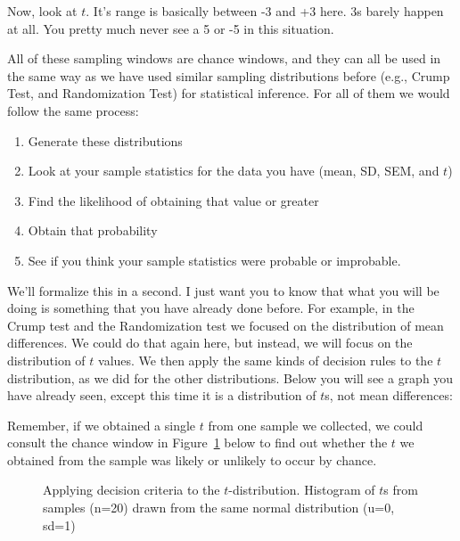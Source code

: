 \documentclass[
  letterpaper,
  DIV=11,
  numbers=noendperiod]{scrreprt}
\providecommand{\tightlist}{%
  \setlength{\itemsep}{0pt}\setlength{\parskip}{0pt}}\usepackage{longtable,booktabs,array}
\begin{document}
Now, look at \(t\). It's range is basically between -3 and +3 here. 3s
barely happen at all. You pretty much never see a 5 or -5 in this
situation.

All of these sampling windows are chance windows, and they can all be
used in the same way as we have used similar sampling distributions
before (e.g., Crump Test, and Randomization Test) for statistical
inference. For all of them we would follow the same process:

\begin{enumerate}
\def\labelenumi{\arabic{enumi}.}
\tightlist
\item
  Generate these distributions
\item
  Look at your sample statistics for the data you have (mean, SD, SEM,
  and \(t\))
\item
  Find the likelihood of obtaining that value or greater
\item
  Obtain that probability
\item
  See if you think your sample statistics were probable or improbable.
\end{enumerate}

We'll formalize this in a second. I just want you to know that what you
will be doing is something that you have already done before. For
example, in the Crump test and the Randomization test we focused on the
distribution of mean differences. We could do that again here, but
instead, we will focus on the distribution of \(t\) values. We then
apply the same kinds of decision rules to the \(t\) distribution, as we
did for the other distributions. Below you will see a graph you have
already seen, except this time it is a distribution of \(t\)s, not mean
differences:

Remember, if we obtained a single \(t\) from one sample we collected, we
could consult the chance window in Figure~\ref{fig-7tdecision} below to
find out whether the \(t\) we obtained from the sample was likely or
unlikely to occur by chance.

\begin{figure}


\caption{\label{fig-7tdecision}Applying decision criteria to the
\(t\)-distribution. Histogram of \(t\)s from samples (n=20) drawn from
the same normal distribution (u=0, sd=1)}

\end{figure}%
\end{document}
